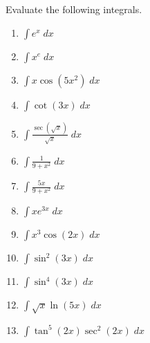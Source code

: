 \documentclass{exam}[12pt]
\begin{document}
\pagestyle{head}

\extraheadheight{-.2in}
\extrafootheight{-.3in} 


\vspace{.2in}
\large{
Evaluate the following integrals.
\begin{enumerate}
\item $\displaystyle \int e^x \; dx   $
\vspace{.2in}
\item $\displaystyle \int x^e \; dx   $
\vspace{.2in}
\item   $\displaystyle \int x\cos (5x^2) \; dx   $
\vspace{.2in}
\item $\displaystyle \int \cot(3x) \; dx   $
\vspace{.2in}
\item $\displaystyle \int \frac{\sec(\sqrt{x})}{\sqrt{x}} \; dx   $
\vspace{.2in}
\item $\displaystyle \int \frac{1}{9+x^2}\; dx   $
\vspace{.2in}

\item $\displaystyle \int \frac{5x}{9+x^2}\; dx   $
\vspace{.2in}

\item $\displaystyle \int  x e^{3x} \; dx   $
\vspace{.2in}

\item $\displaystyle \int x^3 \cos(2x)\; dx   $
\vspace{.2in}

\item $\displaystyle \int \sin^2(3x)\; dx   $
\vspace{.2in}

\item $\displaystyle \int \sin^4(3x)\; dx   $
\vspace{.2in}

\item $\displaystyle \int \sqrt{x} \ln(5x)\; dx   $
\vspace{.2in}

\item $\displaystyle \int \tan^5(2x) \sec^2(2x)\; dx   $
\vspace{.2in}






\end{enumerate}
}
\end{document}
